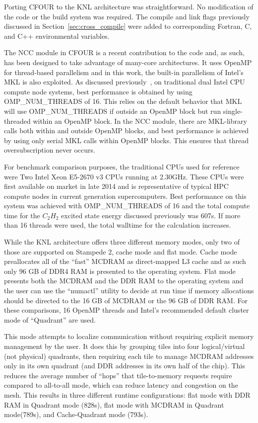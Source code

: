Porting CFOUR to the KNL architecture was straightforward. No modification of the code or the build
system was required. The compile and link flags previously discussed in Section~\ref{sec:cross_compile}
were added to corresponding Fortran, C, and C++ environmental variables.

The NCC module in CFOUR is a recent contribution to the code and, as such, has been designed to take
advantage of many-core architectures. It uses OpenMP for thread-based parallelism and in this work, the
built-in parallelism of Intel's MKL is also exploited. As discussed previously~\cite{ncc:15},
on traditional dual Intel CPU compute node systems, best performance is obtained 
by using OMP\_NUM\_THREADS of 16. This relies on the default behavior that MKL will use OMP\_NUM\_THREADS 
if outside an OpenMP block but run single-threaded within an OpenMP block. 
In the NCC module, there are MKL-library calls both within and outside OpenMP blocks, and best performance is 
achieved by using only serial MKL calls within OpenMP blocks. This ensures that thread oversubscription never occurs.

For benchmark comparison purposes, the traditional CPUs used for reference were Two Intel Xeon E5-2670 v3 CPUs
running at 2.30GHz. These CPUs were first available on market in late 2014 and is representative of typical HPC 
compute nodes in current generation supercomputers. Best performance on this system was achieved with 
OMP\_NUM\_THREADS of 16 and the total compute time for the $C_2H_2$ excited state energy discussed previously
was 607s.
If more than 16 threads were used, the total walltime for the calculation increases. 

While the KNL architecture offers three different memory modes, only two of those are supported on Stampede 2,
cache mode and flat mode. Cache mode preallocates all of the ``fast'' MCDRAM as direct-mapped L3 cache and
as such only 96 GB of DDR4 RAM is presented to the operating system. Flat mode presents both the MCDRAM and the 
DDR RAM to the operating system and the user can use the ``numactl'' utility to decide at run time if memory 
allocations should be directed to the 16 GB of MCDRAM or the 96 GB of DDR RAM. For these comparisons, 16 OpenMP
threads and Intel's recommended default cluster mode of ``Quadrant'' are used.

This mode attempts to localize communication without requiring explicit memory management by the user. 
It does this by grouping tiles into four logical/virtual (not physical) quadrants, then requiring each tile 
to manage MCDRAM addresses only in its own quadrant (and DDR addresses in its own half of the chip). 
This reduces the average number of ``hops'' that tile-to-memory requests require compared to all-to-all mode, 
which can reduce latency and congestion on the mesh. This results in three different runtime configurations:
flat mode with DDR RAM in Quadrant mode (828s), flat mode with MCDRAM in Quadrant mode(789s), and
Cache-Quadrant mode (793s). 

